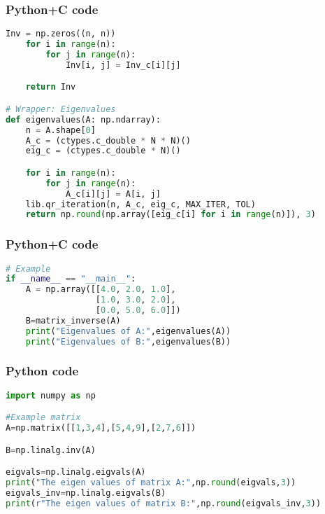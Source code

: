 \documentclass{beamer}
\begin{document}
\begin{frame}[fragile]
    \frametitle{Python+C code}

    \begin{lstlisting}[language=Python]
Inv = np.zeros((n, n))
    for i in range(n):
        for j in range(n):
            Inv[i, j] = Inv_c[i][j]

    return Inv

# Wrapper: Eigenvalues
def eigenvalues(A: np.ndarray):
    n = A.shape[0]
    A_c = (ctypes.c_double * N * N)()
    eig_c = (ctypes.c_double * N)()

    for i in range(n):
        for j in range(n):
            A_c[i][j] = A[i, j]
    lib.qr_iteration(n, A_c, eig_c, MAX_ITER, TOL)
    return np.round(np.array([eig_c[i] for i in range(n)]), 3)
    \end{lstlisting}
\end{frame}

\begin{frame}[fragile]
    \frametitle{Python+C code}

    \begin{lstlisting}[language=Python]
# Example 
if __name__ == "__main__":
    A = np.array([[4.0, 2.0, 1.0],
                  [1.0, 3.0, 2.0],
                  [0.0, 5.0, 6.0]])
    B=matrix_inverse(A)
    print("Eigenvalues of A:",eigenvalues(A))
    print("Eigenvalues of B:",eigenvalues(B))
    \end{lstlisting}
\end{frame}

\begin{frame}[fragile]
    \frametitle{Python code}
    \begin{lstlisting}[language=Python]
import numpy as np

#Example matrix
A=np.matrix([[1,3,4],[5,4,9],[2,7,6]])

B=np.linalg.inv(A)

eigvals=np.linalg.eigvals(A)
print("The eigen values of matrix A:",np.round(eigvals,3))
eigvals_inv=np.linalg.eigvals(B)
print(r"The eigen values of matrix B:",np.round(eigvals_inv,3))
    \end{lstlisting}   
\end{frame}
\end{document}
